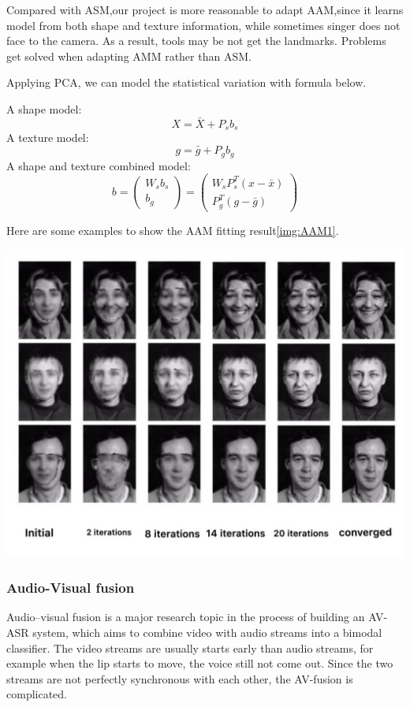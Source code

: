 Compared with ASM,our project is more reasonable to adapt AAM,since it learns model from both shape and texture information, while sometimes singer does not face to the camera. As a result, tools may be not get the landmarks. Problems get solved when adapting AMM rather than ASM.

Applying PCA, we can model the statistical variation with formula below.
        
        A shape model:
        \begin{equation} X=\bar{X}+P_{s}b_{s}\end{equation}
        A texture model:
        \begin{equation}  g=\bar{g}+P_{g}b_{g}\end{equation}
        A shape and texture combined model:
        \begin{equation}  
       b=\begin{pmatrix}
W_{s}b_{s}\\b_{g}
\end{pmatrix}=\begin{pmatrix}
W_{s}P_{s}^{T}(x-\bar{x})\\ P_{g}^{T}(g-\bar{g})
\end{pmatrix}
        \end{equation}
        
Here are some examples to show the AAM fitting result\ref{img:AAM1}.
\begin{center}
\includegraphics[width=0.8\linewidth]{images/AAM1.jpeg}\\[1cm]
\label{img:AAM1}
\end{center}

\subsubsection{Audio-Visual fusion}
Audio–visual fusion is a major research topic in the process of building an AV-ASR system, which aims to combine video with audio streams into a bimodal classifier. The video streams are usually starts early than audio streams, for example when the lip starts to move, the voice still not come out. Since the two streams are not perfectly synchronous with each other, the AV-fusion is complicated.

